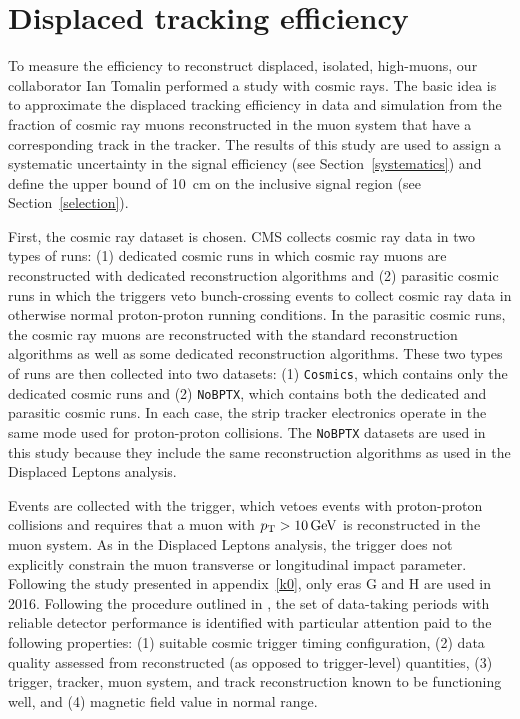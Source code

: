 \chapter{Displaced tracking efficiency}
\label{displaced_tracking_eff}
To measure the efficiency to reconstruct displaced, isolated, high-\pt muons, our collaborator Ian Tomalin performed a study with cosmic rays. The basic idea is to approximate the displaced tracking efficiency in data and simulation from the fraction of cosmic ray muons reconstructed in the muon system that have a corresponding track in the tracker. The results of this study are used to assign a systematic uncertainty in the signal efficiency (see Section~\ref{systematics}) and define the upper bound of \SI{10}{\cm} on the inclusive signal region (see Section~\ref{selection}).

First, the cosmic ray dataset is chosen. CMS collects cosmic ray data in two types of runs: (1) dedicated cosmic runs in which cosmic ray muons are reconstructed with dedicated reconstruction algorithms and (2) parasitic cosmic runs in which the triggers veto bunch-crossing events to collect cosmic ray data in otherwise normal proton-proton running conditions. In the parasitic cosmic runs, the cosmic ray muons are reconstructed with the standard reconstruction algorithms as well as some dedicated reconstruction algorithms. These two types of runs are then collected into two datasets: (1) \texttt{Cosmics}, which contains only the dedicated cosmic runs and (2) \texttt{NoBPTX}, which contains both the dedicated and parasitic cosmic runs. In each case, the strip tracker electronics operate in the same mode used for proton-proton collisions. The \texttt{NoBPTX} datasets are used in this study because they include the same reconstruction algorithms as used in the Displaced Leptons analysis.

Events are collected with the  trigger, which vetoes events with proton-proton collisions and requires that a muon with $\pt>\SI{10}{\GeV}$ is reconstructed in the muon system. As in the Displaced Leptons analysis, the trigger does not explicitly constrain the muon transverse or longitudinal impact parameter. Following the study presented in appendix~\ref{k0}, only eras G and H are used in 2016. Following the procedure outlined in \cite{json_docs}, the set of data-taking periods with reliable detector performance is identified with particular attention paid to the following properties: (1) suitable cosmic trigger timing configuration, (2) data quality assessed from reconstructed (as opposed to trigger-level) quantities, (3) trigger, tracker, muon system, and track reconstruction known to be functioning well, and (4) magnetic field value in normal range.

